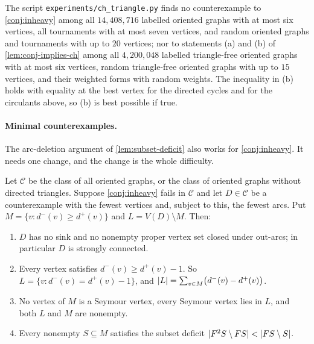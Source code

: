 \begin{remark}\label{rem:ch-evidence}
The script \texttt{experiments/ch\_triangle.py} finds no counterexample to
\cref{conj:inheavy} among all $14{,}408{,}716$ labelled oriented graphs with at most six
vertices, all tournaments with at most seven vertices, and random oriented graphs and
tournaments with up to $20$ vertices; nor to statements (a) and (b) of
\cref{lem:conj-implies-ch} among all $4{,}200{,}048$ labelled triangle-free oriented
graphs with at most six vertices, random triangle-free oriented graphs with up to $15$
vertices, and their weighted forms with random weights. The inequality in (b)
holds with equality at the best vertex for the directed cycles and for the circulants
above, so (b) is best possible if true.
\end{remark}

\paragraph{Minimal counterexamples.}
The arc-deletion argument of \cref{lem:subset-deficit} also works for
\cref{conj:inheavy}. It needs one change, and the change is the whole difficulty.

\begin{proposition}\label{prop:inheavy-minimal}
Let $\mathcal C$ be the class of all oriented graphs, or the class of oriented graphs
without directed triangles. Suppose \cref{conj:inheavy} fails in $\mathcal C$ and let
$D\in\mathcal C$ be a counterexample with the fewest vertices and, subject to this, the
fewest arcs. Put $M=\{v: d^-(v)\ge d^+(v)\}$ and $L=V(D)\setminus M$. Then:
\begin{enumerate}[label=\textup{(\alph*)}]
\item $D$ has no sink and no nonempty proper vertex set closed under out-arcs; in
particular $D$ is strongly connected.
\item Every vertex satisfies $d^-(v)\ge d^+(v)-1$. So $L=\{v: d^-(v)=d^+(v)-1\}$, and
$\lvert L\rvert=\sum_{v\in M}\bigl(d^-(v)-d^+(v)\bigr)$.
\item No vertex of $M$ is a Seymour vertex, every Seymour vertex lies in $L$, and both
$L$ and $M$ are nonempty.
\item Every nonempty $S\subseteq M$ satisfies the subset deficit
$\lvert F^2S\setminus FS\rvert<\lvert FS\setminus S\rvert$.
\end{enumerate}
\end{proposition}

